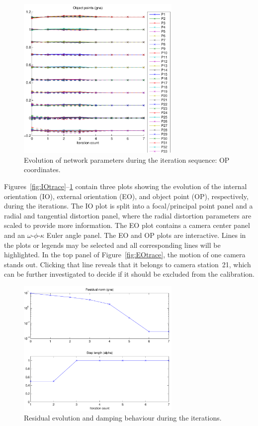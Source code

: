 \documentclass{article}
\begin{document}
\begin{figure}
  \centering
  \includegraphics[width=0.7\textwidth]{ill/ccamoptrace}
    \caption{Evolution of network parameters during the iteration
    sequence: OP coordinates.}
    \label{fig:OPtrace}
\end{figure}

Figures~\ref{fig:IOtrace}--\ref{fig:OPtrace} contain three plots
showing the evolution of the internal orientation (IO), external
orientation (EO), and object point (OP), respectively, during the
iterations. The IO plot is split into a focal/principal point panel
and a radial and tangential distortion panel, where the radial
distortion parameters are scaled to provide more information. The EO
plot contains a camera center panel and an $\omega$-$\phi$-$\kappa$
Euler angle panel. The EO and OP plots are interactive. Lines in the
plots or legends may be selected and all corresponding lines will be
highlighted. In the top panel of Figure~\ref{fig:EOtrace}, the motion
of one camera stands out. Clicking that line reveals that it belongs
to camera station~21, which can be further investigated to decide if
it should be excluded from the calibration.

\begin{figure}
  \centering
  \includegraphics[width=0.7\textwidth]{ill/ccamgnatrace}
  \caption{Residual evolution and damping behaviour during the
    iterations.}
  \label{fig:gnatrace}
\end{figure}
\end{document}
